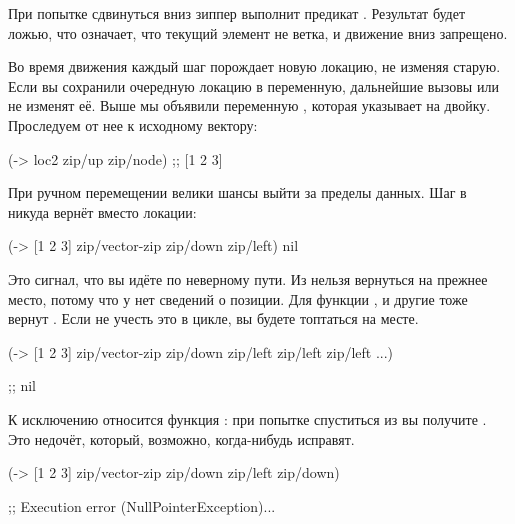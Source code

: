При попытке сдвинуться вниз зиппер выполнит предикат . Результат
будет ложью, что означает, что текущий элемент не ветка, и движение вниз
запрещено.

Во время движения каждый шаг порождает новую локацию, не изменяя старую. Если вы
сохранили очередную локацию в переменную, дальнейшие вызовы  или
 не изменят её. Выше мы объявили переменную , которая
указывает на двойку. Проследуем от нее к исходному вектору:

\begin{english}
  \begin{clojure}
(-> loc2 zip/up zip/node)
;; [1 2 3]
  \end{clojure}
\end{english}

При ручном перемещении велики шансы выйти за пределы данных. Шаг в никуда вернёт
 вместо локации:

\begin{english}
  \begin{clojure}
(-> [1 2 3]
    zip/vector-zip
    zip/down
    zip/left)
nil
  \end{clojure}
\end{english}

Это сигнал, что вы идёте по неверному пути. Из  нельзя вернуться на
прежнее место, потому что у  нет сведений о позиции. Для 
функции ,  и другие тоже вернут . Если не
учесть это в цикле, вы будете топтаться на месте.

\begin{english}
  \begin{clojure}
(-> [1 2 3]
    zip/vector-zip
    zip/down
    zip/left
    zip/left
    zip/left
    ...)

;; nil
  \end{clojure}
\end{english}

К исключению относится функция : при попытке спуститься из  вы
получите . Это недочёт, который, возможно, когда-нибудь
исправят.

\begin{english}
  \begin{clojure}
(-> [1 2 3]
    zip/vector-zip
    zip/down
    zip/left
    zip/down)

;; Execution error (NullPointerException)...
  \end{clojure}
\end{english}

